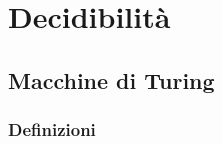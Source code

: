 \documentclass[a4paper, 12pt]{report}
\begin{document}

    \chapter{Decidibilità}

    \section{Macchine di Turing}

    \subsection{Definizioni}
\end{document}
